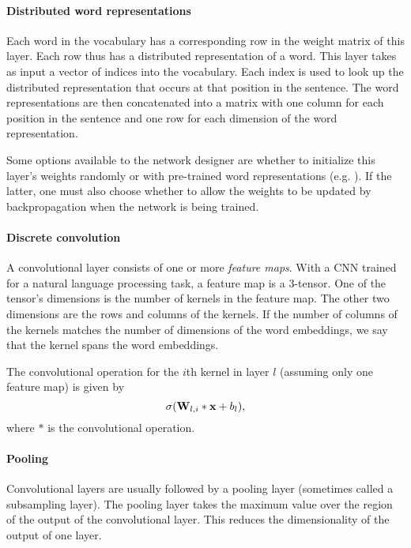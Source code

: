 \paragraph{Distributed word representations}

Each word in the vocabulary has a corresponding row in the weight matrix of this layer.  Each row thus has a distributed representation of a word.  This layer takes as input a vector of indices into the vocabulary.  Each index is used to look up the distributed representation that occurs at that position in the sentence.  The word representations are then concatenated into a matrix with one column for each position in the sentence and one row for each dimension of the word representation.

Some options available to the network designer are whether to initialize this layer's weights randomly or with pre-trained word representations (e.g. \cite{Mikolov2013-vo}).  If the latter, one must also choose whether to allow the weights to be updated by backpropagation when the network is being trained.

\paragraph{Discrete convolution}
\label{sec:convlayer}

A convolutional layer consists of one or more \textit{feature maps}.
With a CNN trained for a natural language processing task, a feature
map is a 3-tensor.  One of the tensor's dimensions is the number of
kernels in the feature map.  The other two dimensions are the rows
and columns of the kernels.  If the number of columns of the kernels
matches the number of dimensions of the word embeddings, we say that
the kernel spans the word embeddings.  

The convolutional operation for the $i$th kernel in layer $l$ (assuming only one feature map) is given by
\begin{equation}
\sigma(\mathbf{W}_{l,i} \ast \mathbf{x} + b_l),
\end{equation}
where $\ast$ is the convolutional operation.  

\paragraph{Pooling}
\label{sec:poollayer}

Convolutional layers are usually followed by a pooling layer (sometimes called a subsampling layer).  The pooling layer takes the maximum value over the region of the output of the convolutional layer.  This reduces the dimensionality of the output of one layer. 

